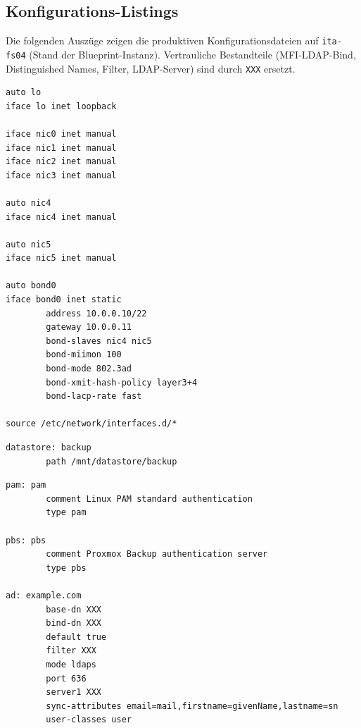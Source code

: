 \clearpage
\subsection{Konfigurations-Listings}
\label{app:Listings}
Die folgenden Auszüge zeigen die produktiven Konfigurations\-dateien
auf \texttt{ita-fs04} (Stand der Blueprint-Instanz). Vertrauliche
Bestandteile (MFI-LDAP-Bind, Distinguished Names, Filter,
LDAP-Server) sind durch \texttt{XXX} ersetzt.

\begin{lstlisting}[caption={\texttt{/etc/network/interfaces} -- LACP-Bond aus 2$\times$10\,GbE},label=lst:interfaces]
auto lo
iface lo inet loopback

iface nic0 inet manual
iface nic1 inet manual
iface nic2 inet manual
iface nic3 inet manual

auto nic4
iface nic4 inet manual

auto nic5
iface nic5 inet manual

auto bond0
iface bond0 inet static
        address 10.0.0.10/22
        gateway 10.0.0.11
        bond-slaves nic4 nic5
        bond-miimon 100
        bond-mode 802.3ad
        bond-xmit-hash-policy layer3+4
        bond-lacp-rate fast

source /etc/network/interfaces.d/*
\end{lstlisting}
\clearpage

\begin{lstlisting}[caption={\texttt{/etc/proxmox-backup/datastore.cfg}},label=lst:datastore]
datastore: backup
        path /mnt/datastore/backup
\end{lstlisting}
\clearpage

\begin{lstlisting}[caption={\texttt{/etc/proxmox-backup/domains.cfg} (MFI-spezifische Daten geschwärzt)},label=lst:ldap]
pam: pam
        comment Linux PAM standard authentication
        type pam

pbs: pbs
        comment Proxmox Backup authentication server
        type pbs

ad: example.com
        base-dn XXX
        bind-dn XXX
        default true
        filter XXX
        mode ldaps
        port 636
        server1 XXX
        sync-attributes email=mail,firstname=givenName,lastname=sn
        user-classes user
\end{lstlisting}

